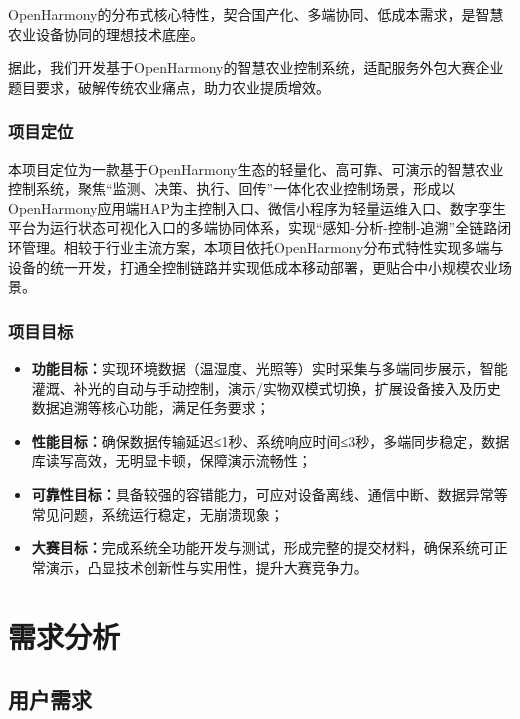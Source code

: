 \documentclass{article}
\begin{document}
OpenHarmony的分布式核心特性，契合国产化、多端协同、低成本需求，是智慧农业设备协同的理想技术底座。

据此，我们开发基于OpenHarmony的智慧农业控制系统，适配服务外包大赛企业题目要求，破解传统农业痛点，助力农业提质增效。

\subsubsection{项目定位}

本项目定位为一款基于OpenHarmony生态的轻量化、高可靠、可演示的智慧农业控制系统，聚焦“监测、决策、执行、回传”一体化农业控制场景，形成以OpenHarmony应用端HAP为主控制入口、微信小程序为轻量运维入口、数字孪生平台为运行状态可视化入口的多端协同体系，实现“感知-分析-控制-追溯”全链路闭环管理。相较于行业主流方案，本项目依托OpenHarmony分布式特性实现多端与设备的统一开发，打通全控制链路并实现低成本移动部署，更贴合中小规模农业场景。

\subsubsection{项目目标}

\begin{itemize}[leftmargin=2em,itemsep=0.2em,topsep=0.2em]
    \item \textbf{功能目标：}实现环境数据（温湿度、光照等）实时采集与多端同步展示，智能灌溉、补光的自动与手动控制，演示/实物双模式切换，扩展设备接入及历史数据追溯等核心功能，满足任务要求；
    \item \textbf{性能目标：}确保数据传输延迟≤1秒、系统响应时间≤3秒，多端同步稳定，数据库读写高效，无明显卡顿，保障演示流畅性；
    \item \textbf{可靠性目标：}具备较强的容错能力，可应对设备离线、通信中断、数据异常等常见问题，系统运行稳定，无崩溃现象；
    \item \textbf{大赛目标：}完成系统全功能开发与测试，形成完整的提交材料，确保系统可正常演示，凸显技术创新性与实用性，提升大赛竞争力。
\end{itemize}

\section{需求分析}

\subsection{用户需求}
\end{document}
